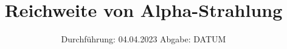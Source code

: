 

\subject{V701}
\title{Reichweite von Alpha-Strahlung}
\date{%
  Durchführung: 04.04.2023
  \hspace{3em}
  Abgabe: DATUM
}



\maketitle
\thispagestyle{empty}
\tableofcontents
\newpage






\printbibliography{}


